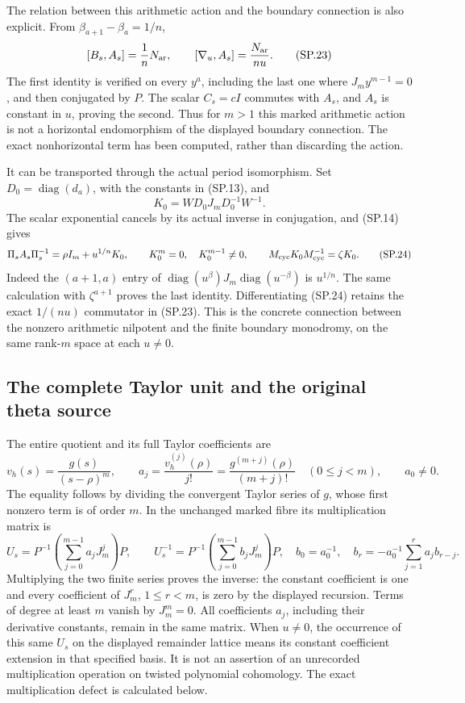 The relation between this arithmetic action and the boundary
connection is also explicit. From
\(\beta_{a+1}-\beta_a=1/n\),
\[
 [B_s,A_s]=\frac1nN_{\rm ar},\qquad
 [\nabla_u,A_s]=\frac{N_{\rm ar}}{nu}.
 \tag{SP.23}\label{CFStage:eq:sp-commutator}
\]
The first identity is verified on every \(y^a\), including
the last one where \(J_my^{m-1}=0\), and then conjugated
by \(P\). The scalar \(C_s=cI\) commutes with \(A_s\),
and \(A_s\) is constant in \(u\), proving the second.
Thus for \(m>1\) this marked arithmetic action is not a
horizontal endomorphism of the displayed boundary connection.
The exact nonhorizontal term has been computed, rather
than discarding the action.

It can be transported through the actual period isomorphism.
Set \(D_0=\operatorname{diag}(d_a)\), with the constants
in (SP.13), and
\[
 K_0=WD_0J_mD_0^{-1}W^{-1}.
 \]
The scalar exponential cancels by its actual inverse in
conjugation, and (SP.14) gives
\[
 \Pi_s A_s\Pi_s^{-1}
    =\rho I_m+u^{1/n}K_0,\qquad
 K_0^m=0,\quad K_0^{m-1}\ne0,\qquad
 M_{\rm cyc}K_0M_{\rm cyc}^{-1}=\zeta K_0 .
 \tag{SP.24}\label{CFStage:eq:sp-periodaction}
\]
Indeed the \((a+1,a)\) entry of
\(\operatorname{diag}(u^{\beta})J_m
\operatorname{diag}(u^{-\beta})\) is \(u^{1/n}\).
The same calculation with \(\zeta^{a+1}\) proves the last
identity. Differentiating (SP.24) retains the exact
\(1/(nu)\) commutator in (SP.23).
This is the concrete connection between the nonzero
arithmetic nilpotent and the finite boundary monodromy,
on the same rank-\(m\) space at each \(u\ne0\).

\subsection{The complete Taylor unit and the original theta source}

The entire quotient and its full Taylor coefficients are
\[
 v_h(s)=\frac{g(s)}{(s-\rho)^m},\qquad
 a_j=\frac{v_h^{(j)}(\rho)}{j!}
       =\frac{g^{(m+j)}(\rho)}{(m+j)!}\quad(0\le j<m),
 \qquad a_0\ne0 .
 \tag{SP.25}\label{CFStage:eq:sp-unitcoeff}
\]
The equality follows by dividing the convergent Taylor
series of \(g\), whose first nonzero term is of order \(m\).
In the unchanged marked fibre its multiplication matrix is
\[
 U_s=P^{-1}\left(\sum_{j=0}^{m-1}a_jJ_m^j\right)P,
 \qquad
 U_s^{-1}=P^{-1}\left(\sum_{j=0}^{m-1}b_jJ_m^j\right)P,
 \quad
 b_0=a_0^{-1},\quad
 b_r=-a_0^{-1}\sum_{j=1}^r a_jb_{r-j}.
 \tag{SP.26}\label{CFStage:eq:sp-unitmatrix}
\]
Multiplying the two finite series proves the inverse:
the constant coefficient is one and every coefficient of
\(J_m^r\), \(1\le r<m\), is zero by the displayed recursion.
Terms of degree at least \(m\) vanish by \(J_m^m=0\).
All coefficients \(a_j\), including their derivative constants,
remain in the same matrix.
When \(u\ne0\), the occurrence of this same \(U_s\) on the
displayed remainder lattice means its constant coefficient
extension in that specified basis. It is not an assertion of
an unrecorded multiplication operation on twisted polynomial
cohomology. The exact multiplication defect is calculated below.

